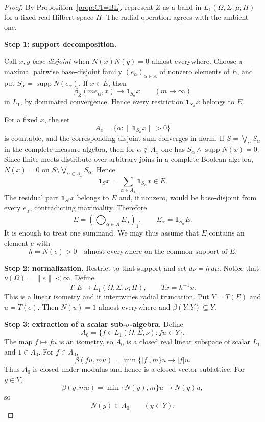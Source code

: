 \documentclass[11pt]{article}
\newcommand{\1}{\mathbf 1}
\newcommand{\supp}{\operatorname{supp}}
\theoremstyle{definition}
\theoremstyle{remark}
\begin{document}
\begin{proof}
By Proposition~\ref{prop:C1=BL}, represent $Z$ as a band in
$L_1(\Omega,\Sigma,\mu;H)$ for a fixed real Hilbert space $H$.  The radial
operation agrees with the ambient one.

\medskip
\noindent\textbf{Step 1: support decomposition.}\par
Call $x,y$ \emph{base-disjoint} when $N(x)N(y)=0$ almost everywhere.  Choose
a maximal pairwise base-disjoint family $(e_\alpha)_{\alpha\in A}$ of
nonzero elements of $E$, and put
$S_\alpha=\supp N(e_\alpha)$.  If $x\in E$, then
\[
       \beta_Z(me_\alpha,x)\longrightarrow \1_{S_\alpha}x
       \qquad(m\to\infty)
\]
in $L_1$, by dominated convergence.  Hence every restriction
$\1_{S_\alpha}x$ belongs to $E$.

For a fixed $x$, the set
\[
 A_x=\{\alpha:\|\1_{S_\alpha}x\|>0\}
\]
is countable, and the corresponding disjoint sum converges in norm.  If
$S=\bigvee_\alpha S_\alpha$ in the complete measure algebra, then for
$\alpha\notin A_x$ one has
$S_\alpha\wedge\supp N(x)=0$.  Since finite meets distribute over arbitrary
joins in a complete Boolean algebra,
$N(x)=0$ on $S\setminus\bigvee_{\alpha\in A_x}S_\alpha$.  Hence
\[
              \1_Sx=\sum_{\alpha\in A_x}\1_{S_\alpha}x\in E.
\]
The residual part $\1_{S^c}x$ belongs to $E$ and, if nonzero, would be
base-disjoint from every $e_\alpha$, contradicting maximality.  Therefore
\begin{equation}
\label{eq:E-decomp}
       E=\left(\bigoplus_{\alpha\in A}E_\alpha\right)_1,
       \qquad E_\alpha=\1_{S_\alpha}E.
\end{equation}
It is enough to treat one summand.  We may thus assume that $E$ contains an
element $e$ with
\[
       h=N(e)>0\quad\text{almost everywhere on the common support of }E.
\]

\medskip
\noindent\textbf{Step 2: normalization.}
Restrict to that support and set $d\nu=h\,d\mu$.  Notice that
$\nu(\Omega)=\|e\|<\infty$.  Define
\[
        T:E\longrightarrow L_1(\Omega,\Sigma,\nu;H),
        \qquad Tx=h^{-1}x.
\]
This is a linear isometry and it intertwines radial truncation.  Put
$Y=T(E)$ and $u=T(e)$.  Then $N(u)=1$ almost everywhere and
$\beta(Y,Y)\subseteq Y$.

\medskip
\noindent\textbf{Step 3: extraction of a scalar sub-$\sigma$-algebra.}
Define
\[
       A_0=\{f\in L_1(\Omega,\Sigma,\nu):fu\in Y\}.
\]
The map $f\mapsto fu$ is an isometry, so $A_0$ is a closed real linear
subspace of scalar $L_1$ and $1\in A_0$.  For $f\in A_0$,
\[
       \beta(fu,mu)=\min\{|f|,m\}u\longrightarrow |f|u.
\]
Thus $A_0$ is closed under modulus and hence is a closed vector sublattice.
For $y\in Y$,
\[
       \beta(y,mu)=\min\{N(y),m\}u\longrightarrow N(y)u,
\]
so
\begin{equation}
\label{eq:Ny-in-A}
                       N(y)\in A_0\qquad(y\in Y).
\end{equation}


\end{proof}
\end{document}
